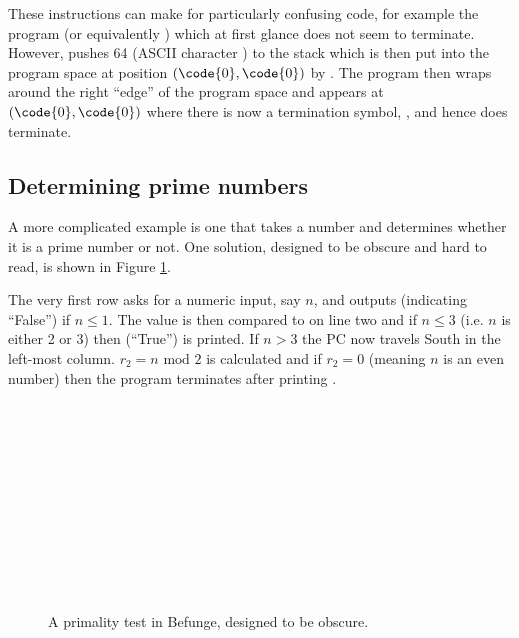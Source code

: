 \documentclass[12pt, a4paper]{article}
\begin{document}
These instructions can make for particularly confusing code, for example the program  (or equivalently ) which at first glance does not seem to terminate. However,  pushes 64 (ASCII character ) to the stack which is then put into the program space at position $(\code{0}, \code{0})$ by . The program then wraps around the right “edge” of the program space and appears at $(\code{0}, \code{0})$ where there is now a termination symbol, , and hence does terminate.

\subsection{Determining prime numbers}

A more complicated example is one that takes a number and determines whether it is a prime number or not. One solution, designed to be obscure and hard to read, is shown in Figure \ref{fig:prime}.

The very first row asks for a numeric input, say $n$, and outputs  (indicating “False”) if $n \leq 1$. The value is then compared to  on line two and if $n \leq 3$ (i.e. $n$ is either 2 or 3) then  (“True”) is printed. If $n > 3$ the PC now travels South in the left-most column. $r_2 = n \text{ mod } 2$ is calculated and if $r_2 = 0$ (meaning $n$ is an even number) then the program terminates after printing .

\begin{figure}[!ht]
\centering
{}\\
\\
\\
\\
\\
\\
\code{\hspace{-4em}>\^{}:}\\
\\
\code{\hspace{-4em}\$\textbackslash:}\\
\\
\caption{A primality test in Befunge, designed to be obscure.}
\label{fig:prime}
\end{figure}
\end{document}
